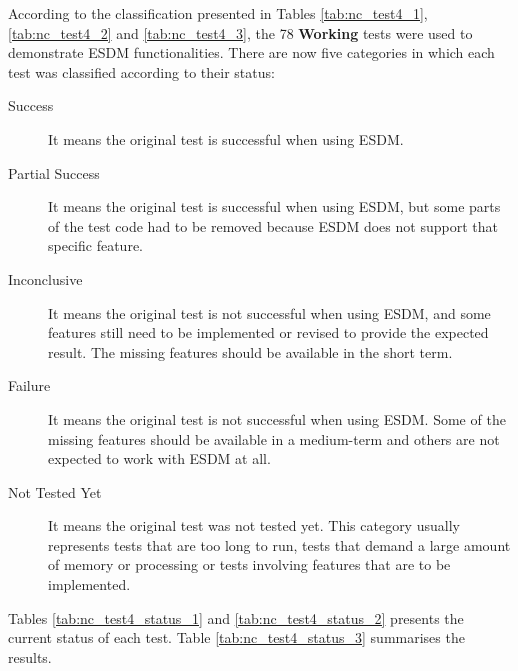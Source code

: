 According to the classification presented in Tables \ref{tab:nc_test4_1}, \ref{tab:nc_test4_2} and \ref{tab:nc_test4_3}, the 78 {\bf Working} tests were used to demonstrate ESDM functionalities. There are now five categories in which each test was classified according to their status:

\begin{description}

\item[Success] It means the original test is successful when using ESDM.

\item[Partial Success] It means the original test is successful when using ESDM, but some parts of the test code had to be removed because ESDM does not support that specific feature.

\item[Inconclusive] It means the original test is not successful when using ESDM, and some features still need to be implemented or revised to provide the expected result. The missing features should be available in the short term.

\item[Failure] It means the original test is not successful when using ESDM. Some of the missing features should be available in a medium-term and others are not expected to work with ESDM at all.

\item[Not Tested Yet] It means the original test was not tested yet. This category usually represents tests that are too long to run, tests that demand a large amount of memory or processing or tests involving features that are to be implemented.

\end{description}

Tables \ref{tab:nc_test4_status_1} and \ref{tab:nc_test4_status_2} presents the current status of each test. Table \ref{tab:nc_test4_status_3} summarises the results.
